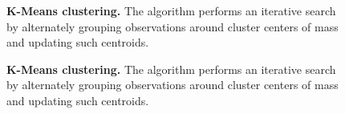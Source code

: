 \begin{figure}
    \caption{\textbf{K-Means clustering.} The algorithm performs an iterative search by alternately grouping observations around cluster centers of mass and updating such centroids.}
    \label{fig:kmeans-pipeline1}
\end{figure}


\begin{figure}
    \centering
     \caption{\textbf{K-Means clustering.} The algorithm performs an iterative search by alternately grouping observations around cluster centers of mass and updating such centroids.}
    \label{fig:kmeans-pipeline}
\end{figure}

    

